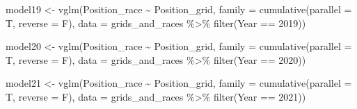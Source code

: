 \documentclass[
]{book}
\newenvironment{Shaded}{\begin{snugshade}}{\end{snugshade}}
\newcommand{\AttributeTok}[1]{\textcolor[rgb]{0.77,0.63,0.00}{#1}}
\newcommand{\DecValTok}[1]{\textcolor[rgb]{0.00,0.00,0.81}{#1}}
\newcommand{\FunctionTok}[1]{\textcolor[rgb]{0.00,0.00,0.00}{#1}}
\newcommand{\NormalTok}[1]{#1}
\newcommand{\OtherTok}[1]{\textcolor[rgb]{0.56,0.35,0.01}{#1}}
\newcommand{\SpecialCharTok}[1]{\textcolor[rgb]{0.00,0.00,0.00}{#1}}
\begin{document}
\begin{Shaded}
\begin{Highlighting}[]
\NormalTok{model19 }\OtherTok{\textless{}{-}} \FunctionTok{vglm}\NormalTok{(Position\_race }\SpecialCharTok{\textasciitilde{}}\NormalTok{ Position\_grid, }
                      \AttributeTok{family =} \FunctionTok{cumulative}\NormalTok{(}\AttributeTok{parallel =}\NormalTok{ T, }\AttributeTok{reverse =}\NormalTok{ F),}
                      \AttributeTok{data =}\NormalTok{ grids\_and\_races }\SpecialCharTok{\%\textgreater{}\%}
                       \FunctionTok{filter}\NormalTok{(Year }\SpecialCharTok{==} \DecValTok{2019}\NormalTok{))}

\NormalTok{model20 }\OtherTok{\textless{}{-}} \FunctionTok{vglm}\NormalTok{(Position\_race }\SpecialCharTok{\textasciitilde{}}\NormalTok{ Position\_grid, }
                      \AttributeTok{family =} \FunctionTok{cumulative}\NormalTok{(}\AttributeTok{parallel =}\NormalTok{ T, }\AttributeTok{reverse =}\NormalTok{ F),}
                      \AttributeTok{data =}\NormalTok{ grids\_and\_races }\SpecialCharTok{\%\textgreater{}\%}
                       \FunctionTok{filter}\NormalTok{(Year }\SpecialCharTok{==} \DecValTok{2020}\NormalTok{))}

\NormalTok{model21 }\OtherTok{\textless{}{-}} \FunctionTok{vglm}\NormalTok{(Position\_race }\SpecialCharTok{\textasciitilde{}}\NormalTok{ Position\_grid, }
                      \AttributeTok{family =} \FunctionTok{cumulative}\NormalTok{(}\AttributeTok{parallel =}\NormalTok{ T, }\AttributeTok{reverse =}\NormalTok{ F),}
                      \AttributeTok{data =}\NormalTok{ grids\_and\_races }\SpecialCharTok{\%\textgreater{}\%}
                       \FunctionTok{filter}\NormalTok{(Year }\SpecialCharTok{==} \DecValTok{2021}\NormalTok{))}
\end{Highlighting}
\end{Shaded}
\end{document}
